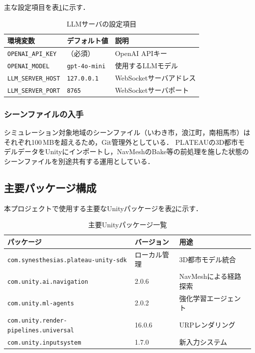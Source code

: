 \documentclass[a4paper,11pt]{jsarticle}
\begin{document}
主な設定項目を表\ref{tab:llmconfig}に示す．

\begin{table}[htbp]
\centering
\caption{LLMサーバの設定項目}
\label{tab:llmconfig}
\begin{tabularx}{\textwidth}{lll}
\toprule
環境変数 & デフォルト値 & 説明 \\
\midrule
\texttt{OPENAI\_API\_KEY} & （必須） & OpenAI APIキー \\
\texttt{OPENAI\_MODEL} & \texttt{gpt-4o-mini} & 使用するLLMモデル \\
\texttt{LLM\_SERVER\_HOST} & \texttt{127.0.0.1} & WebSocketサーバアドレス \\
\texttt{LLM\_SERVER\_PORT} & \texttt{8765} & WebSocketサーバポート \\
\bottomrule
\end{tabularx}
\end{table}

\subsubsection{シーンファイルの入手}

シミュレーション対象地域のシーンファイル（いわき市，浪江町，南相馬市）はそれぞれ100\,MBを超えるため，Git管理外としている．
PLATEAUの3D都市モデルデータをUnityにインポートし，NavMeshのBake等の前処理を施した状態のシーンファイルを別途共有する運用としている．

\subsection{主要パッケージ構成}

本プロジェクトで使用する主要なUnityパッケージを表\ref{tab:packages}に示す．

\begin{table}[htbp]
\centering
\caption{主要Unityパッケージ一覧}
\label{tab:packages}
\begin{tabularx}{\textwidth}{lll}
\toprule
パッケージ & バージョン & 用途 \\
\midrule
\texttt{com.synesthesias.plateau-unity-sdk} & ローカル管理 & 3D都市モデル統合 \\
\texttt{com.unity.ai.navigation} & 2.0.6 & NavMeshによる経路探索 \\
\texttt{com.unity.ml-agents} & 2.0.2 & 強化学習エージェント \\
\texttt{com.unity.render-pipelines.universal} & 16.0.6 & URPレンダリング \\
\texttt{com.unity.inputsystem} & 1.7.0 & 新入力システム \\
\bottomrule
\end{tabularx}
\end{table}
\end{document}
